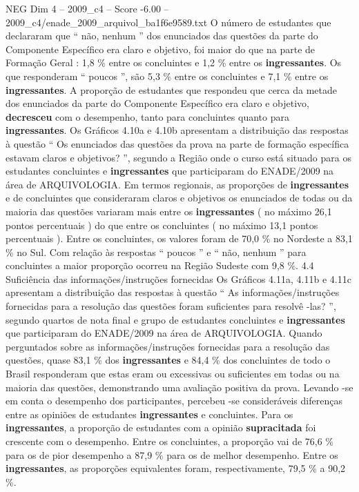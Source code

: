 \begin{textsample}{NEG Dim 4 – 2009\_c4 – Score -6.00 – 2009\_c4/enade\_2009\_arquivol\_ba1f6e9589.txt}
O número de estudantes que declararam que “ não, nenhum ” dos enunciados das questões da parte do Componente Específico era claro e objetivo, foi maior do que na parte de Formação Geral : 1,8 \% entre os concluintes e 1,2 \% entre os \textbf{ingressantes}.
Os que responderam “ poucos ”, são 5,3 \% entre os concluintes e 7,1 \% entre os \textbf{ingressantes}.
A proporção de estudantes que respondeu que cerca da metade dos enunciados da parte do Componente Específico era claro e objetivo, \textbf{decresceu} com o desempenho, tanto para concluintes quanto para \textbf{ingressantes}.
Os Gráficos 4.10a e 4.10b apresentam a distribuição das respostas à questão “ Os enunciados das questões da prova na parte de formação específica estavam claros e objetivos? ”, segundo a Região onde o curso está situado para os estudantes concluintes e \textbf{ingressantes} que participaram do ENADE/2009 na área de ARQUIVOLOGIA.
Em termos regionais, as proporções de \textbf{ingressantes} e de concluintes que consideraram claros e objetivos os enunciados de todas ou da maioria das questões variaram mais entre os \textbf{ingressantes} ( no máximo 26,1 pontos percentuais ) do que entre os concluintes ( no máximo 13,1 pontos percentuais ).
Entre os concluintes, os valores foram de 70,0 \% no Nordeste a 83,1 \% no Sul.
Com relação às respostas “ poucos ” e “ não, nenhum ” para concluintes a maior proporção ocorreu na Região Sudeste com 9,8 \%. 4.4 Suficiência das informações/instruções fornecidas Os Gráficos 4.11a, 4.11b e 4.11c apresentam a distribuição das respostas à questão “ As informações/instruções fornecidas para a resolução das questões foram suficientes para resolvê -las? ”, segundo quartos de nota final e grupo de estudantes concluintes e \textbf{ingressantes} que participaram do ENADE/2009 na área de ARQUIVOLOGIA.
Quando perguntados sobre as informações/instruções fornecidas para a resolução das questões, quase 83,1 \% dos \textbf{ingressantes} e 84,4 \% dos concluintes de todo o Brasil responderam que estas eram ou excessivas ou suficientes em todas ou na maioria das questões, demonstrando uma avaliação positiva da prova.
Levando -se em conta o desempenho dos participantes, percebeu -se consideráveis diferenças entre as opiniões de estudantes \textbf{ingressantes} e concluintes.
Para os \textbf{ingressantes}, a proporção de estudantes com a opinião \textbf{supracitada} foi crescente com o desempenho.
Entre os concluintes, a proporção vai de 76,6 \% para os de pior desempenho a 87,9 \% para os de melhor desempenho.
Entre os \textbf{ingressantes}, as proporções equivalentes foram, respectivamente, 79,5 \% a 90,2 \%.

\end{textsample}
